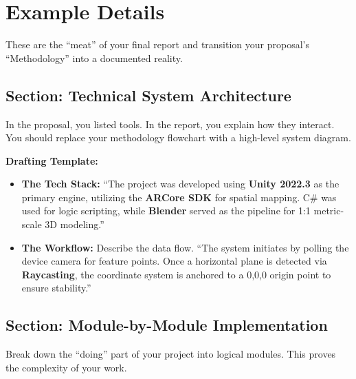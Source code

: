\documentclass[twoside,12pt,openright]{report}
\begin{document}
\section{Example Details}

These are the ``meat'' of your final report and transition your proposal's
``Methodology'' into a documented reality.

\subsection{Section: Technical System Architecture}

In the proposal, you listed tools. In the report, you explain how they interact.
You should replace your methodology flowchart with a high-level system diagram.

\textbf{Drafting Template:}

\begin{itemize}
  \item \textbf{The Tech Stack:} ``The project was developed using \textbf{Unity
    2022.3} as the primary engine, utilizing the \textbf{ARCore SDK} for
    spatial mapping. C\# was used for logic scripting, while \textbf{Blender}
    served as the pipeline for 1:1 metric-scale 3D modeling.''
  \item \textbf{The Workflow:} Describe the data flow. ``The system initiates by
    polling the device camera for feature points. Once a horizontal plane is
    detected via \textbf{Raycasting}, the coordinate system is anchored to a
    0,0,0 origin point to ensure stability.''
\end{itemize}

\subsection{Section: Module-by-Module Implementation}

Break down the ``doing'' part of your project into logical modules. This proves
the complexity of your work.
\end{document}
